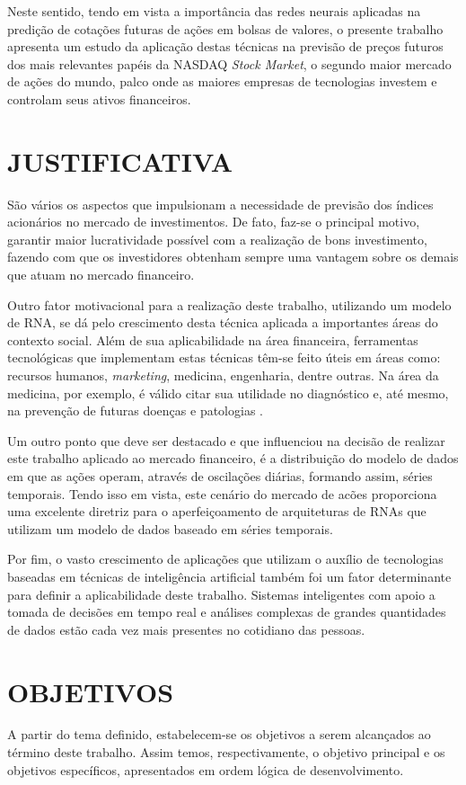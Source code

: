 Neste sentido, tendo em vista a importância das redes neurais aplicadas na predição de cotações futuras de ações em bolsas de valores, o presente trabalho apresenta um estudo da aplicação destas técnicas na previsão de preços futuros dos mais relevantes papéis da NASDAQ \textit{Stock Market}, o segundo maior mercado de ações do mundo, palco onde as maiores empresas de tecnologias investem e controlam seus ativos financeiros.


\section{JUSTIFICATIVA}\label{sec:justificativa}

São vários os aspectos que impulsionam a necessidade de previsão dos índices acionários no mercado de investimentos. De fato, faz-se o principal motivo, garantir maior lucratividade possível com a realização de bons investimento, fazendo com que os investidores obtenham sempre uma vantagem sobre os demais que atuam no mercado financeiro.

Outro fator motivacional para a realização deste trabalho, utilizando um modelo de RNA, se dá pelo crescimento desta técnica aplicada a importantes áreas do contexto social. Além de sua aplicabilidade na área financeira, ferramentas tecnológicas que implementam estas técnicas têm-se feito úteis em áreas como: recursos humanos, \textit{marketing}, medicina, engenharia, dentre outras. Na área da medicina, por exemplo, é válido citar sua utilidade no diagnóstico e, até mesmo, na prevenção de futuras doenças e patologias \cite{marangoni}.

Um outro ponto que deve ser destacado e que influenciou na decisão de realizar este trabalho aplicado ao mercado financeiro, é a distribuição do modelo de dados em que as ações operam, através de oscilações diárias, formando assim, séries temporais. Tendo isso em vista, este cenário do mercado de acões proporciona uma excelente diretriz para o aperfeiçoamento de arquiteturas de RNAs que utilizam um modelo de dados baseado em séries temporais.

Por fim, o vasto crescimento de aplicações que utilizam o auxílio de tecnologias baseadas em técnicas de inteligência artificial também foi um fator determinante para definir a aplicabilidade deste trabalho. Sistemas inteligentes com apoio a tomada de decisões em tempo real e análises complexas de grandes quantidades de dados estão cada vez mais presentes no cotidiano das pessoas.

\section{OBJETIVOS}\label{sec:objetivos}
A partir do tema definido, estabelecem-se os objetivos a serem alcançados ao término deste trabalho. Assim temos, respectivamente, o objetivo principal e os objetivos específicos, apresentados em ordem lógica de desenvolvimento.
